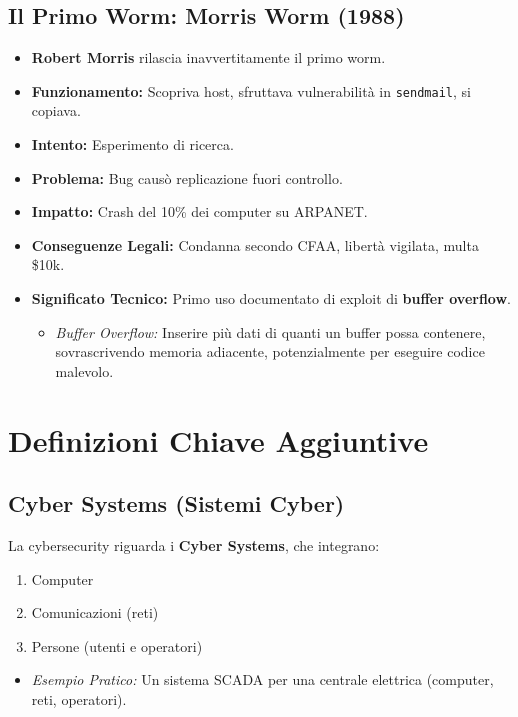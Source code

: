 \subsection{Il Primo Worm: Morris Worm (1988)}
\begin{itemize}
    \item \textbf{Robert Morris} rilascia inavvertitamente il primo worm.
    \item \textbf{Funzionamento:} Scopriva host, sfruttava vulnerabilità in \texttt{sendmail}, si copiava.
    \item \textbf{Intento:} Esperimento di ricerca.
    \item \textbf{Problema:} Bug causò replicazione fuori controllo.
    \item \textbf{Impatto:} Crash del 10\% dei computer su ARPANET.
    \item \textbf{Conseguenze Legali:} Condanna secondo CFAA, libertà vigilata, multa \$10k.
    \item \textbf{Significato Tecnico:} Primo uso documentato di exploit di \textbf{buffer overflow}.
    \begin{itemize}
        \item \textit{Buffer Overflow:} Inserire più dati di quanti un buffer possa contenere, sovrascrivendo memoria adiacente, potenzialmente per eseguire codice malevolo.
    \end{itemize}
\end{itemize}

\section{Definizioni Chiave Aggiuntive}

\subsection{Cyber Systems (Sistemi Cyber)}
La cybersecurity riguarda i \textbf{Cyber Systems}, che integrano:
\begin{enumerate}
    \item Computer
    \item Comunicazioni (reti)
    \item Persone (utenti e operatori)
\end{enumerate}
\begin{itemize}
    \item \textit{Esempio Pratico:} Un sistema SCADA per una centrale elettrica (computer, reti, operatori).
\end{itemize}

